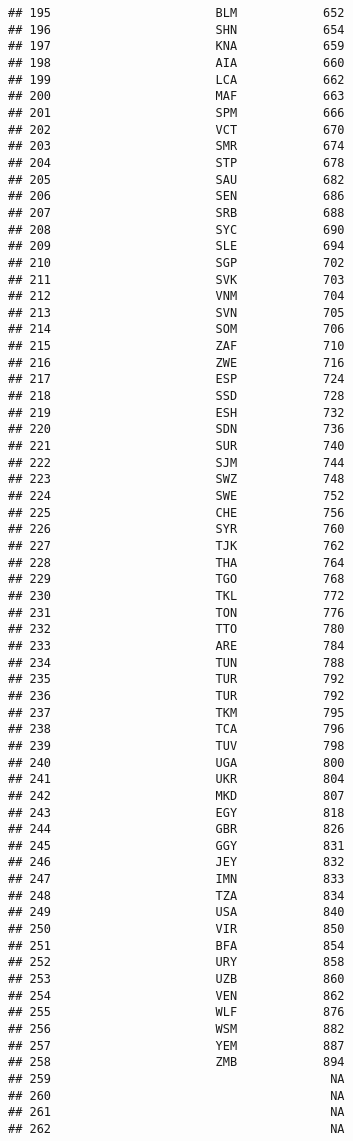 \documentclass[
]{article}
\begin{document}
\begin{verbatim}
## 195                       BLM            652
## 196                       SHN            654
## 197                       KNA            659
## 198                       AIA            660
## 199                       LCA            662
## 200                       MAF            663
## 201                       SPM            666
## 202                       VCT            670
## 203                       SMR            674
## 204                       STP            678
## 205                       SAU            682
## 206                       SEN            686
## 207                       SRB            688
## 208                       SYC            690
## 209                       SLE            694
## 210                       SGP            702
## 211                       SVK            703
## 212                       VNM            704
## 213                       SVN            705
## 214                       SOM            706
## 215                       ZAF            710
## 216                       ZWE            716
## 217                       ESP            724
## 218                       SSD            728
## 219                       ESH            732
## 220                       SDN            736
## 221                       SUR            740
## 222                       SJM            744
## 223                       SWZ            748
## 224                       SWE            752
## 225                       CHE            756
## 226                       SYR            760
## 227                       TJK            762
## 228                       THA            764
## 229                       TGO            768
## 230                       TKL            772
## 231                       TON            776
## 232                       TTO            780
## 233                       ARE            784
## 234                       TUN            788
## 235                       TUR            792
## 236                       TUR            792
## 237                       TKM            795
## 238                       TCA            796
## 239                       TUV            798
## 240                       UGA            800
## 241                       UKR            804
## 242                       MKD            807
## 243                       EGY            818
## 244                       GBR            826
## 245                       GGY            831
## 246                       JEY            832
## 247                       IMN            833
## 248                       TZA            834
## 249                       USA            840
## 250                       VIR            850
## 251                       BFA            854
## 252                       URY            858
## 253                       UZB            860
## 254                       VEN            862
## 255                       WLF            876
## 256                       WSM            882
## 257                       YEM            887
## 258                       ZMB            894
## 259                                       NA
## 260                                       NA
## 261                                       NA
## 262                                       NA
\end{verbatim}
\end{document}
